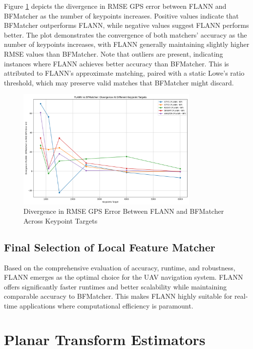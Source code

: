 Figure \ref{fig:divergence_plot} depicts the divergence in RMSE GPS error between FLANN and BFMatcher as the number of keypoints increases. Positive values indicate that BFMatcher outperforms FLANN, while negative values suggest FLANN performs better. The plot demonstrates the convergence of both matchers' accuracy as the number of keypoints increases, with FLANN generally maintaining slightly higher RMSE values than BFMatcher. Note that outliers are present, indicating instances where FLANN achieves better accuracy than BFMatcher. This is attributed to FLANN's approximate matching, paired with a static Lowe's ratio threshold, which may preserve valid matches that BFMatcher might discard.

\begin{figure}[H]
    \centering
    \includegraphics[width=0.8\textwidth]{./Graphs/Divergence_BF_FLANN_KPS.png}
    \caption{Divergence in RMSE GPS Error Between FLANN and BFMatcher Across Keypoint Targets}
    \label{fig:divergence_plot} 
\end{figure}

\subsection{Final Selection of Local Feature Matcher}

Based on the comprehensive evaluation of accuracy, runtime, and robustness, FLANN emerges as the optimal choice for the UAV navigation system. FLANN offers significantly faster runtimes and better scalability while maintaining comparable accuracy to BFMatcher. This makes FLANN highly suitable for real-time applications where computational efficiency is paramount.


\section{Planar Transform Estimators}

